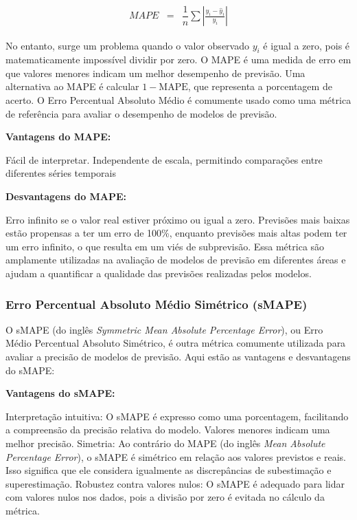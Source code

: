 \begin{eqnarray}
	MAPE &=& \dfrac{1}{n} \sum\left|\frac{y_i - \hat{y}_i}{y_i}\right|\label{eq:mape}
\end{eqnarray}

No entanto, surge um problema quando o valor observado $y_i$ é igual a zero, pois é matematicamente impossível dividir por zero. O MAPE é uma medida de erro em que valores menores indicam um melhor desempenho de previsão.
Uma alternativa ao MAPE é calcular $1 - \text{MAPE}$, que representa a porcentagem de acerto.
O Erro Percentual Absoluto Médio é comumente usado como uma métrica de referência para avaliar o desempenho de modelos de previsão.

\noindent\textbf{Vantagens do MAPE:}


Fácil de interpretar.
Independente de escala, permitindo comparações entre diferentes séries temporais


\noindent\textbf{Desvantagens do MAPE:}

Erro infinito se o valor real estiver próximo ou igual a zero.
Previsões mais baixas estão propensas a ter um erro de 100\%, enquanto previsões mais altas podem ter um erro infinito, o que resulta em um viés de subprevisão.
Essa métrica são amplamente utilizadas na avaliação de modelos de previsão em diferentes áreas e ajudam a quantificar a qualidade das previsões realizadas pelos modelos.

\subsubsection{Erro Percentual Absoluto M\'edio Sim\'etrico (sMAPE)}


O sMAPE (do inglês \textit{Symmetric Mean Absolute Percentage Error}), ou Erro Médio Percentual Absoluto Simétrico, é outra métrica comumente utilizada para avaliar a precisão de modelos de previsão. Aqui estão as vantagens e desvantagens do sMAPE:

\noindent\textbf{Vantagens do sMAPE:}


Interpretação intuitiva: O sMAPE é expresso como uma porcentagem, facilitando a compreensão da precisão relativa do modelo. Valores menores indicam uma melhor precisão.	
Simetria: Ao contrário do MAPE (do inglês \textit{Mean Absolute Percentage Error}), o sMAPE é simétrico em relação aos valores previstos e reais. Isso significa que ele considera igualmente as discrepâncias de subestimação e superestimação.	
Robustez contra valores nulos: O sMAPE é adequado para lidar com valores nulos nos dados, pois a divisão por zero é evitada no cálculo da métrica.



